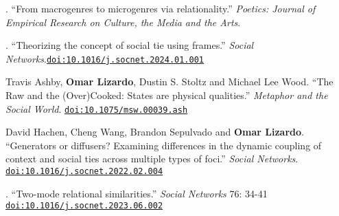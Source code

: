 


. ``From macrogenres to microgenres via relationality.'' {\em Poetics: Journal of Empirical Research on Culture, the Media and the Arts}.

. ``Theorizing the concept of social tie using frames.'' {\em Social Networks}.\href{https://doi.org/10.1016/j.socnet.2024.01.001}{\nolinkurl{doi:10.1016/j.socnet.2024.01.001}}

\ind Travis Ashby, {\bf Omar Lizardo}, Dustin S. Stoltz and Michael Lee Wood. ``The Raw and the (Over)Cooked: States are physical qualities.'' {\em Metaphor and the Social World}. \href{https://doi.org/10.1075/msw.00039.ash}{\nolinkurl{doi:10.1075/msw.00039.ash}} 

\ind David Hachen, Cheng Wang, Brandon Sepulvado and {\bf Omar Lizardo}. ``Generators or diffusers? Examining differences in the dynamic coupling of context and social ties across multiple types of foci.'' {\em Social Networks}. \href{https://doi.org/10.1016/j.socnet.2022.02.004}{\nolinkurl{doi:10.1016/j.socnet.2022.02.004}}

. ``Two-mode relational similarities.'' {\em Social Networks}  76: 34-41 \href{https://doi.org/10.1016/j.socnet.2023.06.002}{\nolinkurl{doi:10.1016/j.socnet.2023.06.002}}

